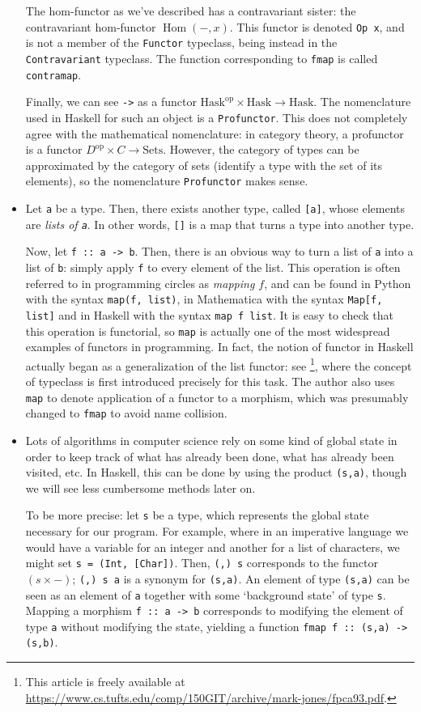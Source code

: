 \documentclass[11	pt]{article}
\theoremstyle{nonumberplain}
\newcommand{\Hask}{\mathrm{Hask}}
\newcommand{\cat}[1]{\mathrm{#1}}
\newcommand{\blank}{{-}}
\newcommand{\op}{\mathrm{op}}
\DeclareMathOperator{\Hom}{Hom}
\newcommand*\lsin{\lstinline}
\begin{document}
\begin{itemize}
The hom-functor as we've described has a contravariant sister: the contravariant hom-functor $\Hom(\blank, x)$. This functor is denoted \lsin|Op x|, and is not a member of the \lsin|Functor| typeclass, being instead in the \lsin|Contravariant| typeclass. The function corresponding to \lsin|fmap| is called \lsin|contramap|.

Finally, we can see \lsin|->| as a functor $\Hask^\op \times \Hask \to \Hask$. The nomenclature used in Haskell for such an object is a \lsin|Profunctor|. This does not completely agree with the mathematical nomenclature: in category theory, a profunctor is a functor $D^\op \times C \to \cat{Sets}$. However, the category of types can be approximated by the category of sets (identify a type with the set of its elements), so the nomenclature \lsin|Profunctor| makes sense.

\item Let \lsin|a| be a type. Then, there exists another type, called \lsin|[a]|, whose elements are \emph{lists of \lsin|a|}. In other words, \lsin|[]| is a map that turns a type into another type.

Now, let \lsin|f :: a -> b|. Then, there is an obvious way to turn a list of \lsin|a| into a list of \lsin|b|: simply apply \lsin|f| to every element of the list. This operation is often referred to in programming circles as \emph{mapping $f$}, and can be found in Python with the syntax \lsin|map(f, list)|, in Mathematica with the syntax \lsin|Map[f, list]| and in Haskell with the syntax \lsin|map f list|. It is easy to check that this operation is functorial, so \lsin|map| is actually one of the most widespread examples of functors in programming. In fact, the notion of functor in Haskell actually began as a generalization of the list functor: see \cite{markjones}\footnote{This article is freely available at \url{https://www.cs.tufts.edu/comp/150GIT/archive/mark-jones/fpca93.pdf}.}, where the concept of typeclass is first introduced precisely for this task. The author also uses \lsin|map| to denote application of a functor to a morphism, which was presumably changed to \lsin|fmap| to avoid name collision.

\item Lots of algorithms in computer science rely on some kind of global state in order to keep track of what has already been done, what has already been visited, etc. In Haskell, this can be done by using the product \lsin|(s,a)|, though we will see less cumbersome methods later on.

To be more precise: let \lsin|s| be a type, which represents the global state necessary for our program. For example, where in an imperative language we would have a variable for an integer and another for a list of characters, we might set \lsin|s = (Int, [Char])|. Then, \lsin|(,) s| corresponds to the functor $(s \times \blank)$; \lsin|(,) s a| is a synonym for \lsin|(s,a)|. An element of type \lsin|(s,a)| can be seen as an element of \lsin|a| together with some `background state' of type \lsin|s|. Mapping a morphism \lsin|f :: a -> b| corresponds to modifying the element of type \lsin|a| without modifying the state, yielding a function \lsin|fmap f :: (s,a) -> (s,b)|.
\end{itemize}
\end{document}

